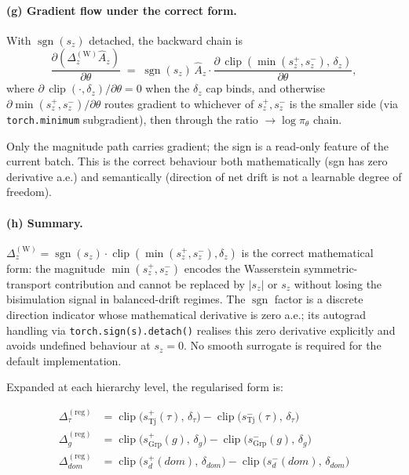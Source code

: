 \documentclass{article}
\DeclareMathOperator*{\clip}{clip}
\begin{document}
\paragraph{(g) Gradient flow under the correct form.}
With $\operatorname{sgn}(s_z)$ detached, the backward chain is
\[
\frac{\partial (\Delta_z^{(\text{W})} \hat A_z)}{\partial \theta}
\;=\; \operatorname{sgn}(s_z)\,\hat A_z \cdot \frac{\partial\,\clip(\min(s_z^+,s_z^-),\,\delta_z)}{\partial \theta},
\]
where $\partial\,\clip(\cdot,\delta_z)/\partial\theta = 0$ when the
$\delta_z$ cap binds, and otherwise $\partial\min(s_z^+,s_z^-)/\partial\theta$
routes gradient to whichever of $s_z^+, s_z^-$ is the smaller side
(via \verb|torch.minimum| subgradient), then through the
ratio $\to\log\pi_\theta$ chain.

Only the magnitude path carries gradient; the sign is a read-only
feature of the current batch. This is the correct behaviour both
mathematically (sgn has zero derivative a.e.) and semantically
(direction of net drift is not a learnable degree of freedom).

\paragraph{(h) Summary.}
$\Delta_z^{(\text{W})} = \operatorname{sgn}(s_z)\cdot\clip(\min(s_z^+,s_z^-),\delta_z)$
is the correct mathematical form: the magnitude $\min(s_z^+,s_z^-)$
encodes the Wasserstein symmetric-transport contribution and cannot be
replaced by $|s_z|$ or $s_z$ without losing the bisimulation signal in
balanced-drift regimes. The $\operatorname{sgn}$ factor is a discrete
direction indicator whose mathematical derivative is zero a.e.; its
autograd handling via \verb|torch.sign(s).detach()| realises this zero
derivative explicitly and avoids undefined behaviour at $s_z=0$. No
smooth surrogate is required for the default implementation.

Expanded at each hierarchy level, the regularised form is:

\begin{align*}
\Delta_\tau^{(\text{reg})}
  &= \clip\!\bigl(s_{\operatorname{Tj}}^{+}(\tau),\,\delta_\tau\bigr) - \clip\!\bigl(s_{\operatorname{Tj}}^{-}(\tau),\,\delta_\tau\bigr) \\
\Delta_g^{(\text{reg})}
  &= \clip\!\bigl(s_{\operatorname{Grp}}^{+}(g),\,\delta_g\bigr) - \clip\!\bigl(s_{\operatorname{Grp}}^{-}(g),\,\delta_g\bigr) \\
\Delta_{dom}^{(\text{reg})}
  &= \clip\!\bigl(s_d^{+}(dom),\,\delta_{dom}\bigr) - \clip\!\bigl(s_d^{-}(dom),\,\delta_{dom}\bigr)
\end{align*}
\end{document}
